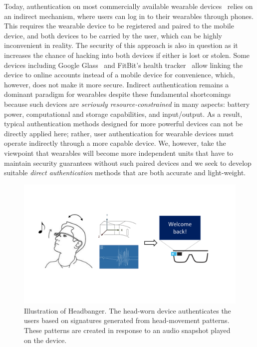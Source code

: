 \vspace{1mm}
Today, authentication on most commercially available wearable devices~\cite{fitbit, smartwatch} relies on an indirect mechanism, where users
can log in to their wearables through phones. This requires the wearable
device to be registered and paired to the mobile device, and both devices to be carried by the user, which can be highly inconvenient in reality. The security of this
approach is also in question as it increases the chance of hacking into both
devices if either is lost or stolen. Some devices including
Google Glass~\cite{googleglass} and FitBit's health tracker~\cite{fitbit}
allow linking the device to online accounts instead of a mobile device for
convenience,  which, however, does not make it more secure. Indirect authentication
remains a
dominant paradigm for wearables despite these fundamental shortcomings because
such devices are \emph{seriously resource-constrained} in many aspects:
battery power, computational and storage capabilities, and input/output. As a result, typical authentication methods designed for more
powerful devices can not be directly applied here; rather, user authentication for wearable devices must operate indirectly
through a more capable device. We, however, take the viewpoint that wearables will become more independent
units that have to maintain security guarantees without such paired devices
and we seek to develop suitable \emph{direct authentication} methods that are
both accurate and light-weight.
\vspace{-1mm}
\begin{figure}[t!]
\centering
\includegraphics[width=\columnwidth]{figure/headbanger_illustrate.png}
\caption{Illustration of Headbanger. The head-worn device authenticates the
users based on signatures generated from head-movement patterns.  These patterns are created in
response to an audio snapshot played on the device.}
\label{fig:headbanger-illustrate}
\end{figure}

